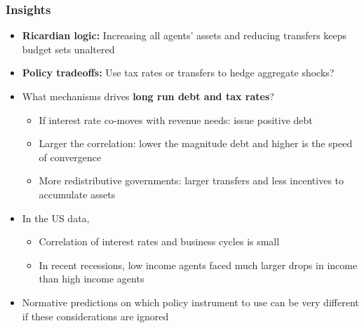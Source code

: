 \documentclass{beamer}
\begin{document}
\begin{frame}%

\frametitle{Insights}
\begin{itemize}
\item \textbf{Ricardian logic:} Increasing all agents' assets and reducing transfers keeps budget sets unaltered

\item \textbf{Policy tradeoffs:} Use tax rates or transfers to hedge aggregate shocks?

\item What mechanisms drives \textbf{long run debt and tax rates}?

\begin{itemize}

\item If interest rate co-moves with revenue needs: issue positive debt

\item Larger the correlation: lower the magnitude debt and higher is the speed of convergence

\item More redistributive governments: larger transfers and less incentives to accumulate assets
\end{itemize}

\item In the US data,
\begin{itemize}
\item Correlation of interest rates and business cycles is small 
\item In recent recessions, low income agents faced much larger drops in income than high income agents
\end{itemize}

\item Normative predictions on which policy instrument to use can be very different if these considerations are ignored
\end{itemize}
\end{frame}%
\end{document}
